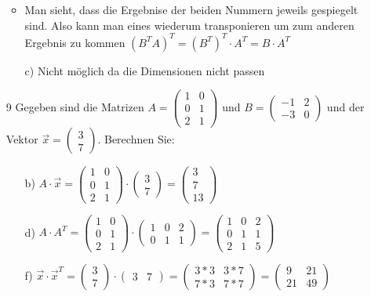 \documentclass{article}
\begin{document}
\begin{itemize}
\begin{itemize}
			\item{Man sieht, dass die Ergebnise der beiden Nummern jeweils gespiegelt sind. Also kann man eines wiederum transponieren um zum anderen Ergebnis zu kommen $(B^TA)^T=(B^T)^T\cdot A^T=B\cdot A^T$}
			\item[c)]{Nicht möglich da die Dimensionen nicht passen}
		\end{itemize}
		\item[9]{Gegeben sind die Matrizen $A=\begin{pmatrix} 1 & 0 \\ 0 & 1 \\ 2 & 1 \end{pmatrix}$ und $B=\begin{pmatrix} -1 & 2 \\ -3 & 0 \end{pmatrix}$ und der Vektor $\vec{x}=\begin{pmatrix} 3 \\ 7 \end{pmatrix}$. Berechnen Sie:}
		\begin{itemize}
			\item[b)]{$A\cdot \vec{x}=\begin{pmatrix} 1 & 0 \\ 0 & 1 \\ 2 & 1 \end{pmatrix}\cdot \begin{pmatrix} 3 \\ 7 \end{pmatrix}=\begin{pmatrix} 3 \\ 7 \\ 13 \end{pmatrix}$}
			\item[d)]{$A\cdot A^T=\begin{pmatrix} 1 & 0 \\ 0 & 1 \\ 2 & 1 \end{pmatrix}\cdot \begin{pmatrix} 1 & 0 & 2 \\ 0 & 1 & 1 \end{pmatrix}=\begin{pmatrix} 1 & 0 & 2 \\ 0 & 1 & 1 \\ 2 & 1 & 5 \end{pmatrix}$}
			\item[f)]{$\vec{x}\cdot \vec{x}^T=\begin{pmatrix} 3 \\ 7 \end{pmatrix}\cdot \begin{pmatrix} 3 & 7 \end{pmatrix}=\begin{pmatrix} 3*3 & 3*7 \\ 7*3 & 7*7 \end{pmatrix}=\begin{pmatrix} 9 & 21 \\ 21 & 49 \end{pmatrix}$}

\end{itemize}
\end{itemize}
\end{document}
